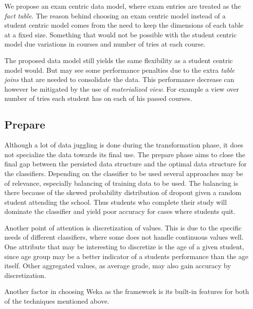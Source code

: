 \bigskip\noindent
We propose an exam centric data model, where exam entries are treated as the \textit{fact table}. 
The reason behind choosing an exam centric model instead of a student centric model comes from the
need to keep the dimensions of each table at a fixed size. Something that would not be possible 
with the student centric model due variations in courses and number of tries at each course.

The proposed data model still yields the same flexibility as a student centric model would. 
But may see some performance penalties due to the extra \textit{table joins} that are needed to consolidate the data.
This performance decrease can however be mitigated by the use of \textit{materialized view}.
For example a view over number of tries each student has on each of his passed courses.

\subsection{Prepare}
Although a lot of data juggling is done during the transformation phase, it does not specialize the data towards its final use. 
The prepare phase aims to close the final gap between the persisted data structure and the optimal data structure for the classifiers.
Depending on the classifier to be used several approaches may be of relevance, especially balancing of training data to be used.
The balancing is there because of the skewed probability distribution of dropout given a random student attending the school.
Thus students who complete their study will dominate the classifier and yield poor accuracy for cases where students quit.

\bigskip\noindent
Another point of attention is discretization of values. 
This is due to the specific needs of different classifiers, where some does not handle continuous values well. 
One attribute that may be interesting to discretize is the age of a given student, 
since age group may be a better indicator of a students performance than the age itself. 
Other aggregated values, as average grade, may also gain accuracy by discretization.

\bigskip\noindent
Another factor in choosing Weka as the framework is its built-in features for both of the techniques mentioned above. 

